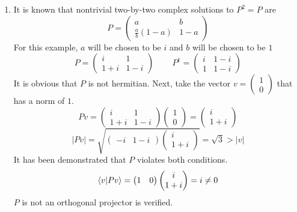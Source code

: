 \begin{sol}
\begin{enumerate}[label=\textbf{(\alph*)}]
\begin{proof}
These two cases proves the theorem.
\end{proof}
\item
It is known that nontrivial two-by-two complex solutions to $P^2=P$ are
\begin{equation}
	P=\begin{pmatrix}
a& b\\\frac{a}{b}(1-a)&1-a
\end{pmatrix}
\end{equation} 
For this example, $a$ will be chosen to be $i$ and $b$ will be chosen to be $1$
\begin{equation}
	P=\begin{pmatrix}i&1\\1+i&1-i\end{pmatrix}\,\,\,\,\,\,\,\,\,\,\,\,\,P^\dagger=\begin{pmatrix}i&1-i\\1&1-i\end{pmatrix}
\end{equation} 
It is obvious that $P$ is not hermitian. Next, take the vector $v=\begin{pmatrix}1\\0\end{pmatrix}$ that has a norm of $1$.
\begin{equation}
	Pv=\begin{pmatrix}i&1\\1+i&1-i\end{pmatrix}\begin{pmatrix}1\\0\end{pmatrix}=\begin{pmatrix}i\\1+i\end{pmatrix}
\end{equation} 
\begin{equation}
	|Pv|=\sqrt{\begin{pmatrix}-i&1-i\end{pmatrix}\begin{pmatrix}i\\1+i\end{pmatrix}}=\sqrt 3>|v|
\end{equation} 
It has been demonstrated that $P$ violates both conditions.
\begin{equation}
	\braket{v}{Pv}=\begin{pmatrix}1&0\end{pmatrix}\begin{pmatrix}i\\1+i\end{pmatrix}=i\neq 0
\end{equation} 
$P$ is not an orthogonal projector is verified. 

\end{enumerate}
\end{sol}